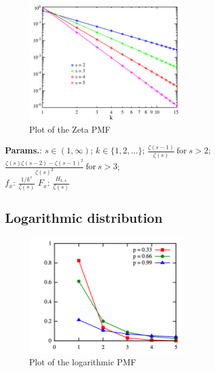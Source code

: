     \begin{figure}[H]
        \centering
        \includegraphics[width=0.6\textwidth]{images/Zeta distribution PMF.png}
        \caption{Plot of the Zeta PMF}
    \end{figure}




    {\color{darkblue} \textbf{Params.}:} {$s\in(1,\infty)$}; {$k \in \{1,2,\ldots\}$}; {$\frac{\zeta(s-1)}{\zeta(s)}~\textrm{for}~s>2$}; {$\frac{\zeta(s)\zeta(s-2) - \zeta(s-1)^2}{\zeta(s)^2}~\textrm{for}~s>3$};\hspace{0.5cm}\\{\color{darkblue} \textbf{$f_x$}:} {$\frac{1/k^s}{\zeta(s)}$}{\color{darkblue} \textbf{$F_x$}:} {$\frac{H_{k,s}}{\zeta(s)}$}



    
        
\subsection{Logarithmic distribution}


    \begin{figure}[H]
        \centering
        \includegraphics[width=0.6\textwidth]{images/Logarithmicpmf.png}
        \caption{Plot of the logarithmic PMF}
    \end{figure}




